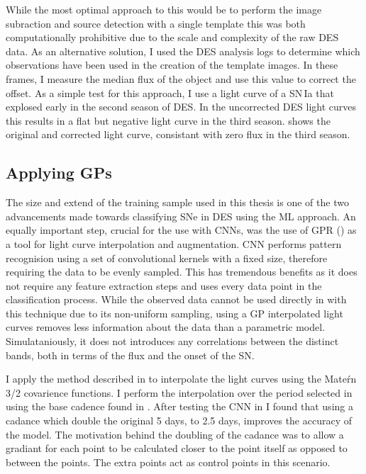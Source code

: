 While the most optimal approach to this would be to perform the image subraction and source detection with a single template this was both computationally prohibitive due to the scale and complexity of the raw DES data. As an alternative solution, I used the DES analysis logs to determine which observations have been used in the creation of the template images. In these frames, I measure the median flux of the object and use this value to correct the offset. As a simple test for this approach, I use a light curve of a SN\,Ia that explosed early in the second season of DES. In the uncorrected DES light curves this results in a flat but negative light curve in the third season.  shows the original and corrected light curve, consistant with zero flux in the third season.

\begin{figure}
  \caption{}
  \label{fig:FluxOffset}
\end{figure}

\subsection{Applying GPs} \label{sec:UseGP}
The size and extend of the training sample used in this thesis is one of the two advancements made towards classifying SNe in DES using the ML approach. An equally important step, crucial for the use with CNNs, was the use of GPR () as a tool for light curve interpolation and augmentation. CNN performs pattern recognision using a set of convolutional kernels with a fixed size, therefore requiring the data to be evenly sampled. This has tremendous benefits as it does not require any feature extraction steps and uses every data point in the classification process. While the observed data cannot be used directly in with this technique due to its non-uniform sampling, using a GP interpolated light curves removes less information about the data than a parametric model. Simulataniously, it does not introduces any correlations between the distinct bands, both in terms of the flux and the onset of the SN.

I apply the method described in  to interpolate the light curves using the Mate\'rn 3/2 covarience functions. I perform the interpolation over the period selected in  using the base cadence found in . After testing the CNN in  I found that using a cadance which double the original 5 days, to 2.5 days, improves the accuracy of the model. The motivation behind the doubling of the cadance was to allow a gradiant for each point to be calculated closer to the point itself as opposed to between the points. The extra points act as control points in this scenario.

